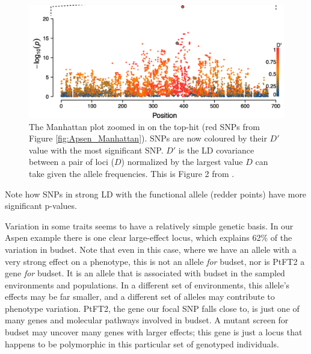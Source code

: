 \begin{figure}
\begin{center}
\includegraphics[width=\textwidth]{Journal_figs/Quant_gen/Wang_GWAS_poplar/Wang_Fig_zoomed_Manhattan.pdf}
\end{center}
\caption{The Manhattan plot zoomed in on the top-hit (red SNPs from Figure
  \ref{fig:Apsen_Manhattan}). SNPs are now coloured by their $D\prime$
  value with the most significant SNP. $D\prime$ is the LD
  covariance between a pair of loci ($D$) normalized by
  the largest value $D$ can take given the allele frequencies. This is Figure 2 from \citet{wang:18}. } \label{fig:Apsen_zoom_Manhattan}
\end{figure}
Note how SNPs in strong LD with the functional allele (redder
points) have more significant p-values. 

Variation in some traits seems to have a relatively simple genetic
basis. In our Aspen example there is one clear large-effect locus,
which explains  62\% of the variation in budset. Note that even in this case, where we have an allele with a very strong effect on a phenotype, this is not an allele {\it for} budset, nor is PtFT2 a gene {\it for} budset.  It is an allele that is associated with budset in the sampled environments and populations. In a different set of environments, this allele's effects may be far smaller, and a different set of alleles may contribute to phenotype variation. PtFT2, the gene our focal SNP falls close to, is just one of many genes and molecular pathways involved in budset. A mutant screen for budset may uncover many genes with larger effects; this gene is just a locus that happens to be polymorphic in this particular set of genotyped individuals. 

